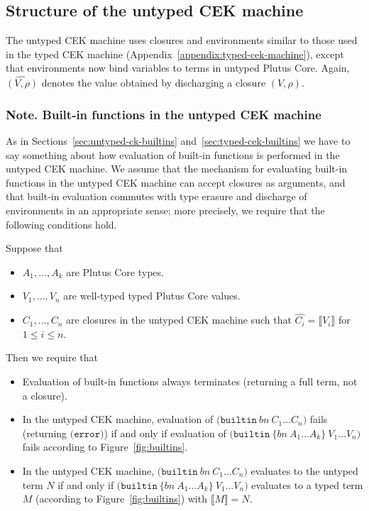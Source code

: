\documentclass[a4paper]{article}
\newcommand{\keyword}[1]{\texttt{#1}}
\newcommand{\construct}[1]{\texttt{(} #1 \texttt{)}}
\newcommand\discharge[1]{\widehat{#1}}
\newcommand{\builtin}[3]{\construct{\keyword{builtin} ~ \texttt{\{} \mathit{#1} ~ #2 \texttt{\}} ~ #3}}
\newcommand{\errorU}{\construct{\keyword{error}}}
\newcommand{\builtinU}[2]{\construct{\keyword{builtin} ~ \mathit{#1} ~ #2}}
\newcommand{\erase}[1]{\llbracket#1\rrbracket}
\begin{document}
\begin{appendices}
\subsection{Structure of the untyped CEK machine}
The untyped CEK machine uses closures and environments similar to
those used in the typed CEK machine
(Appendix~\ref{appendix:typed-cek-machine}), except that environments now
bind variables to terms in untyped Plutus Core.  Again,
$\discharge{(V,\rho)}$ denotes the value obtained by discharging a
closure $(V,\rho)$.



\subsubsection{Note. Built-in functions in the untyped CEK machine}
\label{sec:untyped-cek-builtins}
As in Sections~\ref{sec:untyped-ck-builtins}
and~\ref{sec:typed-cek-builtins} we have to say something about how
evaluation of built-in functions is performed in the untyped CEK
machine. We assume that the mechanism for evaluating built-in
functions in the untyped CEK machine can accept closures as arguments,
and that built-in evaluation commutes with type erasure and discharge
of environments in an appropriate sense; more precisely, we require
that the following conditions hold.

\medskip
\noindent Suppose that
\begin{itemize}
\item $A_1, \ldots, A_k$ are Plutus Core types.
\item $V_1, \ldots, V_n$ are well-typed typed Plutus Core values.
\item $C_1, \ldots, C_n$ are closures in the untyped
CEK machine such that $\discharge{C_i} = \erase{V_i} $ for
$1 \le i \le n$.
\end{itemize}

\noindent Then we require that
\begin{itemize}
\item Evaluation of built-in functions always terminates (returning a full term, not a closure).
\item In the untyped CEK machine, evaluation of 
  $\builtinU{bn}{C_1 \ldots C_n}$
fails (returning $\errorU$) if and only if evaluation of 
  $\builtin{bn}{A_1 \ldots A_k}{V_1 \ldots V_n}$
fails according to Figure~\ref{fig:builtins}.

\item In the untyped CEK machine,
  $\builtinU{bn}{C_1 \ldots C_n}$
evaluates to the untyped term $N$ if and only if
  $\builtin{bn}{A_1 \ldots A_k}{V_1 \ldots V_n}$
evaluates to a typed term $M$ (according to Figure~\ref{fig:builtins}) with $\erase{M} = N$.
\end{itemize}


\end{appendices}
\end{document}
